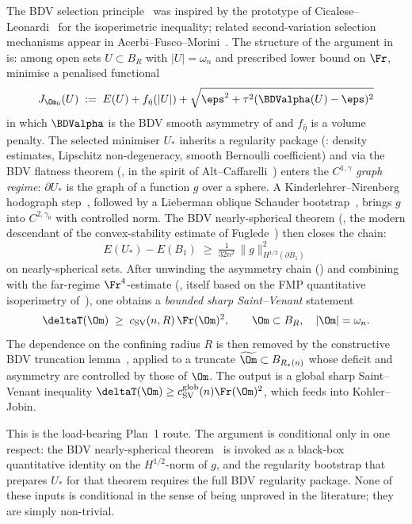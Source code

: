 The BDV selection
principle~\cite{BDV} was inspired by the prototype of
Cicalese--Leonardi~\cite{CL2012} for the isoperimetric inequality;
related second-variation selection mechanisms appear in
Acerbi--Fusco--Morini~\cite{AFM2013}. The structure of the argument
in~\cite{BDV} is: among open sets $U\subset B_R$ with $|U|=\omega_n$
and prescribed lower bound on $\Fr$, minimise a penalised functional
\[
   J_{\Om_0}(U)\;:=\;E(U)+f_{\hat\eta}(|U|)+
      \sqrt{\eps^2+\tau^2(\BDValpha(U)-\eps)^2}
\]
in which $\BDValpha$ is the BDV smooth asymmetry of
\cite[Def.~4.1]{BDV} and $f_{\hat\eta}$ is a volume penalty. The
selected minimiser $U_*$ inherits a regularity package
(\cite[Lem.~4.6, 4.9, 4.12]{BDV}: density estimates, Lipschitz
non-degeneracy, smooth Bernoulli coefficient) and via the BDV
flatness theorem (\cite[Thm~4.18]{BDV}, in the spirit of
Alt--Caffarelli~\cite{AC1981}) enters the $C^{1,\gamma}$ \emph{graph
regime}: $\partial U_*$ is the graph of a function $g$ over a sphere.
A Kinderlehrer--Nirenberg hodograph step~\cite{KN1977}, followed by
a Lieberman oblique Schauder
bootstrap~\cite{Li86a,Li86b,GT1983,BL1976}, brings $g$ into
$C^{2,\gamma_0}$ with controlled norm. The BDV nearly-spherical theorem
(\cite[Thm~3.3]{BDV}, the modern descendant of the convex-stability
estimate of Fuglede~\cite{Fuglede1989}) then closes the chain:
\[
   E(U_*)-E(B_1)\;\ge\;\tfrac{1}{32 n^2}\,\|g\|_{H^{1/2}(\partial B_1)}^2
\]
on nearly-spherical sets. After unwinding the asymmetry chain
(\cite[Lem.~4.2]{BDV}) and combining with the far-regime
$\Fr^4$-estimate (\cite[Lem.~5.1, 5.2]{BDV}, itself based on the FMP
quantitative isoperimetry of~\cite{FMP2008}), one obtains a
\emph{bounded sharp Saint--Venant} statement
\begin{equation}\label{eq:intro-SV-bounded}
   \deltaT(\Om)\;\ge\;c_{\rm SV}(n,R)\,\Fr(\Om)^2,
   \qquad
   \Om\subset B_R,\quad |\Om|=\omega_n.
\end{equation}
The dependence on the confining radius $R$ is then removed by the
constructive BDV truncation lemma~\cite[Lem.~5.3]{BDV}, applied to a
truncate $\widetilde\Om\subset B_{R_*(n)}$ whose deficit and asymmetry
are controlled by those of $\Om$. The output is a global sharp
Saint--Venant inequality $\deltaT(\Om)\ge c_{\rm
SV}^{\rm glob}(n)\Fr(\Om)^2$, which feeds into Kohler--Jobin.

This is the load-bearing Plan~1 route. The argument is conditional
only in one respect: the BDV nearly-spherical
theorem~\cite[Thm~3.3]{BDV} is invoked as a black-box quantitative
identity on the $H^{1/2}$-norm of $g$, and the regularity bootstrap
that prepares $U_*$ for that theorem requires the full BDV regularity
package. None of these inputs is conditional in the sense of being
unproved in the literature; they are simply non-trivial.

